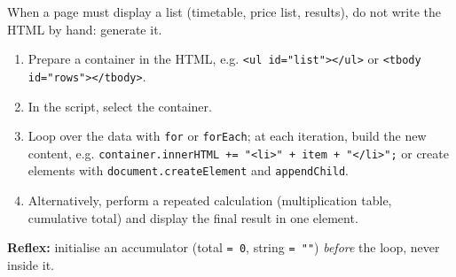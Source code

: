 \documentclass[11pt]{article}
\begin{document}
\begin{methode}
When a page must display a list (timetable, price list, results), do not write the HTML by hand: generate it.
\begin{enumerate}
\item Prepare a container in the HTML, e.g. \texttt{<ul id="list"></ul>} or \texttt{<tbody id="rows"></tbody>}.
\item In the script, select the container.
\item Loop over the data with \texttt{for} or \texttt{forEach}; at each iteration, build the new content, e.g. \texttt{container.innerHTML += "<li>" + item + "</li>";} or create elements with \texttt{document.createElement} and \texttt{appendChild}.
\item Alternatively, perform a repeated calculation (multiplication table, cumulative total) and display the final result in one element.
\end{enumerate}
\textbf{Reflex:} initialise an accumulator (total \texttt{= 0}, string \texttt{= ""}) \emph{before} the loop, never inside it.
\end{methode}
\end{document}
